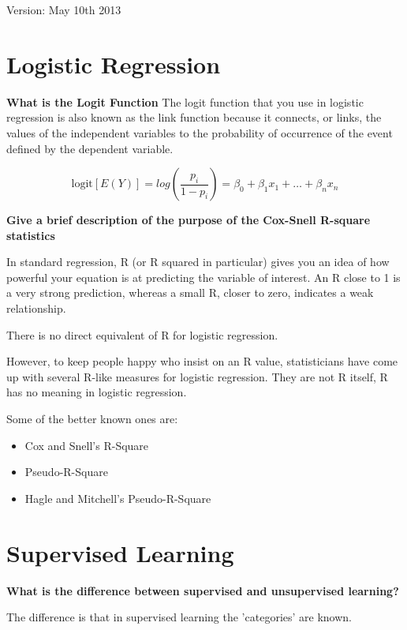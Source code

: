 \documentclass[a4paper,12pt]{article}
\begin{document}
Version: May 10th 2013



\newpage
\section{Logistic Regression}
\textbf{What is the Logit Function}
The logit function that you use in logistic regression is also known as the link function because it connects, or links, the values of the independent variables to the probability of occurrence of the event defined by the dependent variable.

\[ \mbox{logit}[E(Y)] = log(\frac{p_i}{1-p_i}) = \beta_0 + \beta_1x_1 + \ldots + \beta_nx_n \]


\textbf{Give a brief description of the purpose of the Cox-Snell R-square statistics}

In standard regression, R (or R squared in particular) gives you an idea of how powerful your equation is at predicting the variable of interest. An R close to 1 is a very strong prediction, whereas a small R, closer to zero, indicates a weak relationship.

There is no direct equivalent of R for logistic regression.

However, to keep people happy who insist on an R value, statisticians have come up with several R-like measures for logistic regression. They are not R itself, R has no meaning in logistic regression.

Some of the better known ones are:

\begin{itemize}
\item Cox and Snell's R-Square
\item Pseudo-R-Square
\item Hagle and Mitchell's Pseudo-R-Square
\end{itemize}
\newpage
\section{Supervised Learning}


\textbf{What is the difference between supervised and unsupervised learning?}

The difference is that in supervised learning the 'categories' are known.
\end{document}
